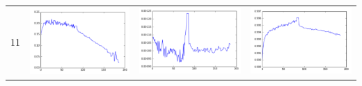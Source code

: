 \documentclass[14pt, a4paper]{extarticle}
\begin{document}
\begin{table}[!htb]
{\begin{tabular}{|c|c|c|c|}
\hline
11 & \includegraphics[scale=0.3]{images/ks_11.png} & \includegraphics[scale=0.3]{images/cvm_11.png} & \includegraphics[scale=0.3]{images/auc_11.png} \\

\end{tabular}}
\end{table}
\end{document}
